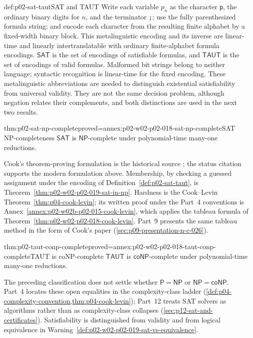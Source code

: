 \begin{hbdefinition}{def:p02-sat-taut}{SAT and TAUT}
Write each variable \(p_n\) as the character \texttt{p}, the ordinary binary
digits for \(n\), and the terminator \texttt{;}; use the fully parenthesized formula string;
and encode each character from the resulting finite alphabet by a fixed-width
binary block.  This metalinguistic encoding and its inverse are linear-time
and linearly intertranslatable with ordinary finite-alphabet formula encodings.
\(\mathsf{SAT}\) is the set of encodings of satisfiable formulas, and
\(\mathsf{TAUT}\) is the set of encodings of valid formulas.
Malformed bit strings belong to neither language; syntactic recognition is
linear-time for the fixed encoding.
These metalinguistic abbreviations are needed to distinguish existential
satisfiability from universal validity.  They are not the same decision
problem, although negation relates their complements, and both distinctions
are used in the next two results.
\end{hbdefinition}

\begin{hbtheorem}{thm:p02-sat-np-complete}{proved=annex:p02-w02-p02-018-sat-np-complete}{SAT NP-completeness}
\(\mathsf{SAT}\) is \(\mathsf{NP}\)-complete under polynomial-time many-one
reductions.
\end{hbtheorem}

Cook's theorem-proving formulation is the historical source
\cite{Cook1971}; the status citation supports the modern formulation above.
Membership, by checking a guessed assignment under the encoding of
Definition~\ref{def:p02-sat-taut}, is
Theorem~\ref{thm:p02-w02-p02-019-sat-in-np}.  Hardness is the Cook--Levin
Theorem~\ref{thm:p04-cook-levin}; its written proof under the Part~4
conventions is Annex~\ref{annex:p02-w02b-p02-015-cook-levin}, which applies
the tableau formula of Theorem~\ref{thm:p02-w02-p02-018-cook-levin}.  Part~9
presents the same tableau method in the form of Cook's paper
(\cref{sec:p09-presentation-n-c-026}).

\begin{hbcorollary}{thm:p02-taut-conp-complete}{proved=annex:p02-w02-p02-018-taut-conp-complete}{TAUT is coNP-complete}
\(\mathsf{TAUT}\) is \(\mathsf{coNP}\)-complete under polynomial-time
many-one reductions.
\end{hbcorollary}

The preceding classification does not settle whether
\(\mathsf P=\mathsf{NP}\) or \(\mathsf{NP}=\mathsf{coNP}\).  Part~4 locates
these open equalities in the complexity-class ladder
(\cref{def:p04-complexity-convention,thm:p04-cook-levin}); Part~12 treats SAT
solvers as algorithms rather than as complexity-class collapses
(\cref{sec:p12-sat-and-certificates}).  Satisfiability is distinguished from
validity and from logical equivalence in
Warning~\ref{def:p02-w02-p02-019-sat-vs-equivalence}.


